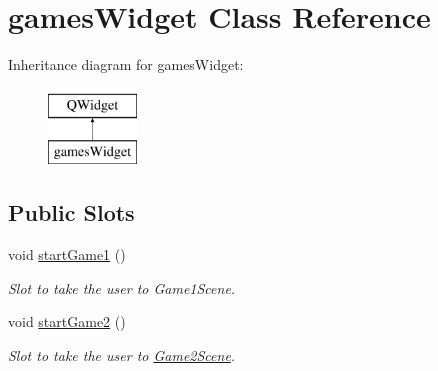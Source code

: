 \hypertarget{classgamesWidget}{\section{games\-Widget Class Reference}
\label{classgamesWidget}
}
Inheritance diagram for games\-Widget\-:\begin{figure}[H]
\begin{center}
\leavevmode
\includegraphics[height=2.000000cm]{classgamesWidget}
\end{center}
\end{figure}
\subsection*{Public Slots}
\begin{DoxyCompactItemize}
\item 
void \hyperlink{classgamesWidget_a746df5e5817b9c6bb1bc41dd97e0bd62}{start\-Game1} ()
\begin{DoxyCompactList}\small\item\em Slot to take the user to Game1\-Scene. \end{DoxyCompactList}\item 
\hypertarget{classgamesWidget_a6b9d62057de5bac6b65b4aa3a9dee61b}{void \hyperlink{classgamesWidget_a6b9d62057de5bac6b65b4aa3a9dee61b}{start\-Game2} ()}\label{classgamesWidget_a6b9d62057de5bac6b65b4aa3a9dee61b}

\begin{DoxyCompactList}\small\item\em Slot to take the user to \hyperlink{classGame2Scene}{Game2\-Scene}. \end{DoxyCompactList}\end{DoxyCompactItemize}
